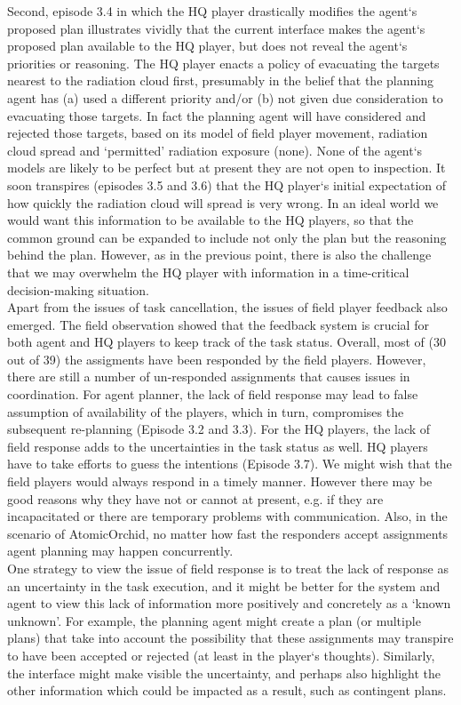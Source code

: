 Second, episode 3.4 in which the HQ player drastically modifies the agent`s proposed plan illustrates vividly that the current interface makes the agent`s proposed plan available to the HQ player, but does not reveal the agent`s priorities or reasoning. The HQ player enacts a policy of evacuating the targets nearest to the radiation cloud first, presumably in the belief that the planning agent has (a) used a different priority and/or (b) not given due consideration to evacuating those targets. In fact the planning agent will have considered and rejected those targets, based on its model of field player movement, radiation cloud spread and `permitted' radiation exposure (none). None of the agent`s models are likely to be perfect but at present they are not open to inspection. It soon transpires (episodes 3.5 and 3.6) that the HQ player`s initial expectation of how quickly the radiation cloud will spread is very wrong. In an ideal world we would want this information to be available to the HQ players, so that the common ground can be expanded to include not only the plan but the reasoning behind the plan. However, as in the previous point, there is also the challenge that we may overwhelm the HQ player with information in a time-critical decision-making situation.\\
	 
Apart from the issues of task cancellation, the issues of field player feedback also emerged. The field observation showed that the feedback system is crucial for both agent and HQ players to keep track of the task status. Overall, most of (30 out of 39) the assigments have been responded by the field players. However, there are still a number of un-responded assignments that causes issues in coordination. For agent planner, the lack of field response may lead to false assumption of availability of the players, which in turn, compromises the subsequent re-planning (Episode 3.2 and 3.3). For the HQ players, the lack of field response adds to the uncertainties in the task status as well. HQ players have to take efforts to guess the intentions (Episode 3.7). We might wish that the field players would always respond in a timely manner. However there may be good reasons why they have not or cannot at present, e.g. if they are incapacitated or there are temporary problems with communication. Also, in the scenario of AtomicOrchid, no matter how fast the responders accept assignments agent planning may happen concurrently.\\

One strategy to view the issue of field response is to treat the lack of response as an uncertainty in the task execution, and it might be better for the system and agent to view this lack of information more positively and concretely as a `known unknown'. For example, the planning agent might create a plan (or multiple plans) that take into account the possibility that these assignments may transpire to have been accepted or rejected (at least in the player`s thoughts). Similarly, the interface might make visible the uncertainty, and perhaps also highlight the other information which could be impacted as a result, such as contingent plans. \\

